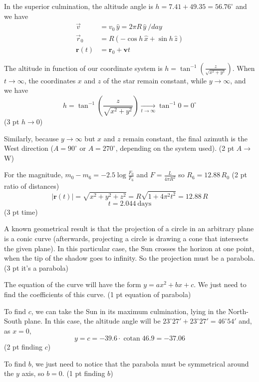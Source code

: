 In the superior culmination, the altitude angle is
$h = 7.41 + 49.35 = 56.76^\circ$ and we have
\begin{align*}
  \vec{v} &= v_0\,\hat{y} = 2\pi R\,\hat{y}\ /day \\
  \vec{r}_0 &= R(-\cos h\,\hat{x} + \sin h\,\hat{z}) \\
  \mathbf{r}(t) &= \mathbf{r}_0 + \mathbf{v}t
\end{align*}

The altitude in function of our coordinate system is
$h = \tan^{-1}\left(\frac{z}{\sqrt{x^2 + y^2}}\right)$. When $t \to \infty$,
the coordinates $x$ and $z$ of the star remain constant, while
$y \to \infty$, and we have
\[
  h = \tan^{-1}\left(\frac{z}{\sqrt{x^2 + y^2}}\right)
    \xrightarrow[t \to \infty]{} \tan^{-1} 0 = 0^\circ
\]
\hfill(3 pt $h \to 0$)

Similarly, because $y \to \infty$ but $x$ and $z$ remain constant, the final
azimuth is the West direction ($A = 90^\circ$ or $A = 270^\circ$, depending on
the system used).
\hfill(2 pt $A \to$ W)

For the magnitude,
$m_0 - m_6 = -2.5\log\frac{F_0}{F_6}$ and $F = \frac{L}{4\pi R^2}$ so
$R_6 = 12.88\,R_0$
\hfill(2 pt ratio of distances)
\[
  |\mathbf{r}(t)| = \sqrt{x^2 + y^2 + z^2} = R\sqrt{1 + 4\pi^2 t^2} = 12.88\,R
\]
\[
  t = 2.044\ \text{days}
\]
\hfill(3 pt time)

A known geometrical result is that the projection of a circle in an arbitrary
plane is a conic curve (afterwards, projecting a circle is drawing a cone that
intersects the given plane). In this particular case, the Sun crosses the
horizon at one point, when the tip of the shadow goes to infinity. So the
projection must be a parabola.
\hfill(3 pt it's a parabola)

The equation of the curve will have the form $y = ax^2 + bx + c$. We just
need to find the coefficients of this curve.
\hfill(1 pt equation of parabola)

To find $c$, we can take the Sun in its maximum culmination, lying in the
North-South plane. In this case, the altitude angle will be
$23^\circ 27' + 23^\circ 27' = 46^\circ 54'$ and, as $x = 0$,
\[
  y = c = -39.6 \cdot \operatorname{cotan} 46.9 = -37.06
\]
\hfill(2 pt finding $c$)

To find $b$, we just need to notice that the parabola must be symmetrical
around the $y$ axis, so $b = 0$.
\hfill(1 pt finding $b$)


